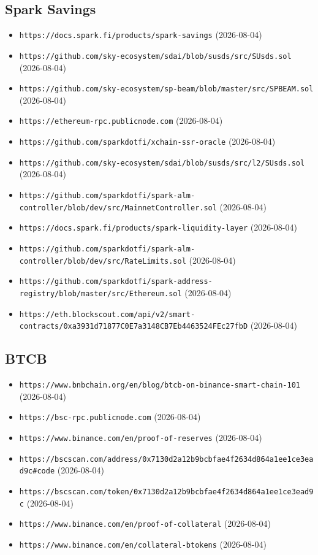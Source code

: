 \subsection*{Spark Savings}
\begin{itemize}\setlength{\itemsep}{0pt}\small
\item \texttt{https://docs.spark.fi/products/spark-savings} (2026-08-04)
\item \texttt{https://github.com/sky-ecosystem/sdai/blob/susds/src/SUsds.sol} (2026-08-04)
\item \texttt{https://github.com/sky-ecosystem/sp-beam/blob/master/src/SPBEAM.sol} (2026-08-04)
\item \texttt{https://ethereum-rpc.publicnode.com} (2026-08-04)
\item \texttt{https://github.com/sparkdotfi/xchain-ssr-oracle} (2026-08-04)
\item \texttt{https://github.com/sky-ecosystem/sdai/blob/susds/src/l2/SUsds.sol} (2026-08-04)
\item \texttt{https://github.com/sparkdotfi/spark-alm-controller/blob/dev/src/MainnetController.sol} (2026-08-04)
\item \texttt{https://docs.spark.fi/products/spark-liquidity-layer} (2026-08-04)
\item \texttt{https://github.com/sparkdotfi/spark-alm-controller/blob/dev/src/RateLimits.sol} (2026-08-04)
\item \texttt{https://github.com/sparkdotfi/spark-address-registry/blob/master/src/Ethereum.sol} (2026-08-04)
\item \texttt{https://eth.blockscout.com/api/v2/smart-contracts/0xa3931d71877C0E7a3148CB7Eb4463524FEc27fbD} (2026-08-04)
\end{itemize}

\subsection*{BTCB}
\begin{itemize}\setlength{\itemsep}{0pt}\small
\item \texttt{https://www.bnbchain.org/en/blog/btcb-on-binance-smart-chain-101} (2026-08-04)
\item \texttt{https://bsc-rpc.publicnode.com} (2026-08-04)
\item \texttt{https://www.binance.com/en/proof-of-reserves} (2026-08-04)
\item \texttt{https://bscscan.com/address/0x7130d2a12b9bcbfae4f2634d864a1ee1ce3ead9c\#code} (2026-08-04)
\item \texttt{https://bscscan.com/token/0x7130d2a12b9bcbfae4f2634d864a1ee1ce3ead9c} (2026-08-04)
\item \texttt{https://www.binance.com/en/proof-of-collateral} (2026-08-04)
\item \texttt{https://www.binance.com/en/collateral-btokens} (2026-08-04)
\end{itemize}

